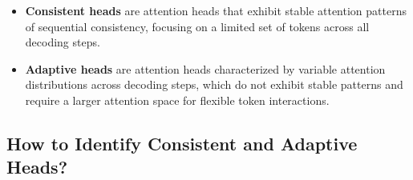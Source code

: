 \begin{itemize}
  \item \textbf{Consistent heads} are attention heads that exhibit stable attention patterns of sequential consistency, focusing on a limited set of tokens across all decoding steps.
  \item \textbf{Adaptive heads} are attention heads characterized by variable attention distributions across decoding steps, which do not exhibit stable patterns and require a larger attention space for flexible token interactions.
\end{itemize}

\subsection{How to Identify Consistent and Adaptive Heads?}
\label{identification_method}




